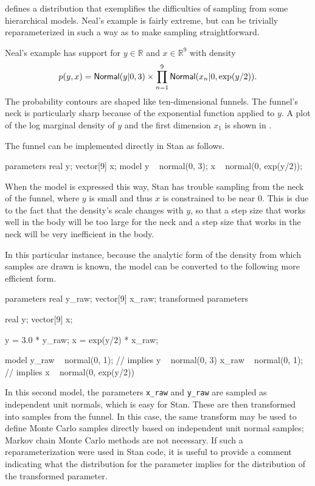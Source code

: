 \citep{Neal:2003} defines a distribution that exemplifies the
difficulties of sampling from some hierarchical models.  Neal's
example is fairly extreme, but can be trivially reparameterized in
such a way as to make sampling straightforward.

Neal's example has support for $y \in
\mathbb{R}$ and  $x \in \mathbb{R}^9$ with density
%
\[
p(y,x) = \mbox{\sf Normal}(y|0,3) \times \prod_{n=1}^9
\mbox{\sf Normal}(x_n|0,\exp(y/2)).
\]
%
The probability contours are shaped like ten-dimensional funnels.  The
funnel's neck is particularly sharp because of the exponential
function applied to $y$.  A plot of the log marginal density of $y$
and the first dimension $x_1$ is shown in .

The funnel can be implemented directly in Stan as follows.
%
\begin{stancode}
parameters {
  real y;
  vector[9] x;
}
model {
  y ~ normal(0, 3);
  x ~ normal(0, exp(y/2));
}
\end{stancode}
%
When the model is expressed this way, Stan has trouble sampling from
the neck of the funnel, where $y$ is small and thus $x$ is constrained
to be near 0.  This is due to the fact that the density's scale
changes with $y$, so that a step size that works well in the body will
be too large for the neck and a step size that works in the neck will be
very inefficient in the body.

In this particular instance, because the analytic form of the density
from which samples are drawn is known, the model can be converted to
the following more efficient form.
%
\begin{stancode}
parameters {
  real y_raw;
  vector[9] x_raw;
}
transformed parameters {
  real y;
  vector[9] x;

  y = 3.0 * y_raw;
  x = exp(y/2) * x_raw;
}
model {
  y_raw ~ normal(0, 1); // implies y ~ normal(0, 3)
  x_raw ~ normal(0, 1); // implies x ~ normal(0, exp(y/2))
}
\end{stancode}
%
In this second model, the parameters \Verb|x_raw| and \Verb|y_raw| are
sampled as independent unit normals, which is easy for Stan.  These
are then transformed into samples from the funnel.  In this case, the
same transform may be used to define Monte Carlo samples directly
based on independent unit normal samples; Markov chain Monte Carlo
methods are not necessary. If such a reparameterization were used in
Stan code, it is useful to provide a comment indicating what the
distribution for the parameter implies for the distribution of the
transformed parameter.

